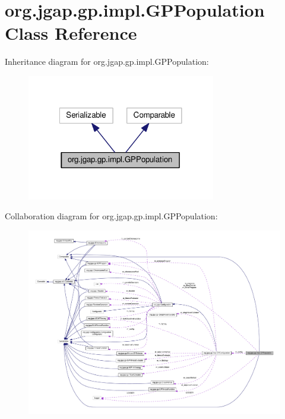 \hypertarget{classorg_1_1jgap_1_1gp_1_1impl_1_1_g_p_population}{\section{org.\-jgap.\-gp.\-impl.\-G\-P\-Population Class Reference}
\label{classorg_1_1jgap_1_1gp_1_1impl_1_1_g_p_population}
}


Inheritance diagram for org.\-jgap.\-gp.\-impl.\-G\-P\-Population\-:
\nopagebreak
\begin{figure}[H]
\begin{center}
\leavevmode
\includegraphics[width=233pt]{classorg_1_1jgap_1_1gp_1_1impl_1_1_g_p_population__inherit__graph}
\end{center}
\end{figure}


Collaboration diagram for org.\-jgap.\-gp.\-impl.\-G\-P\-Population\-:
\nopagebreak
\begin{figure}[H]
\begin{center}
\leavevmode
\includegraphics[width=350pt]{classorg_1_1jgap_1_1gp_1_1impl_1_1_g_p_population__coll__graph}
\end{center}
\end{figure}
